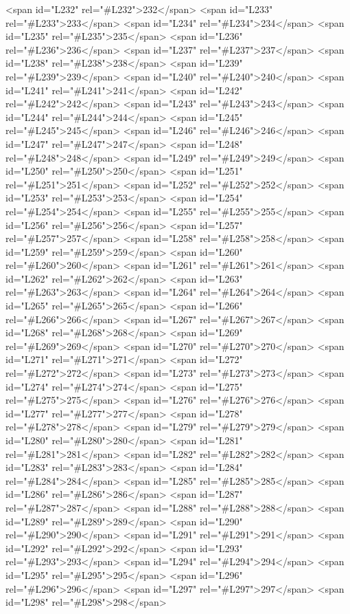 <span id="L232" rel="#L232">232</span>
<span id="L233" rel="#L233">233</span>
<span id="L234" rel="#L234">234</span>
<span id="L235" rel="#L235">235</span>
<span id="L236" rel="#L236">236</span>
<span id="L237" rel="#L237">237</span>
<span id="L238" rel="#L238">238</span>
<span id="L239" rel="#L239">239</span>
<span id="L240" rel="#L240">240</span>
<span id="L241" rel="#L241">241</span>
<span id="L242" rel="#L242">242</span>
<span id="L243" rel="#L243">243</span>
<span id="L244" rel="#L244">244</span>
<span id="L245" rel="#L245">245</span>
<span id="L246" rel="#L246">246</span>
<span id="L247" rel="#L247">247</span>
<span id="L248" rel="#L248">248</span>
<span id="L249" rel="#L249">249</span>
<span id="L250" rel="#L250">250</span>
<span id="L251" rel="#L251">251</span>
<span id="L252" rel="#L252">252</span>
<span id="L253" rel="#L253">253</span>
<span id="L254" rel="#L254">254</span>
<span id="L255" rel="#L255">255</span>
<span id="L256" rel="#L256">256</span>
<span id="L257" rel="#L257">257</span>
<span id="L258" rel="#L258">258</span>
<span id="L259" rel="#L259">259</span>
<span id="L260" rel="#L260">260</span>
<span id="L261" rel="#L261">261</span>
<span id="L262" rel="#L262">262</span>
<span id="L263" rel="#L263">263</span>
<span id="L264" rel="#L264">264</span>
<span id="L265" rel="#L265">265</span>
<span id="L266" rel="#L266">266</span>
<span id="L267" rel="#L267">267</span>
<span id="L268" rel="#L268">268</span>
<span id="L269" rel="#L269">269</span>
<span id="L270" rel="#L270">270</span>
<span id="L271" rel="#L271">271</span>
<span id="L272" rel="#L272">272</span>
<span id="L273" rel="#L273">273</span>
<span id="L274" rel="#L274">274</span>
<span id="L275" rel="#L275">275</span>
<span id="L276" rel="#L276">276</span>
<span id="L277" rel="#L277">277</span>
<span id="L278" rel="#L278">278</span>
<span id="L279" rel="#L279">279</span>
<span id="L280" rel="#L280">280</span>
<span id="L281" rel="#L281">281</span>
<span id="L282" rel="#L282">282</span>
<span id="L283" rel="#L283">283</span>
<span id="L284" rel="#L284">284</span>
<span id="L285" rel="#L285">285</span>
<span id="L286" rel="#L286">286</span>
<span id="L287" rel="#L287">287</span>
<span id="L288" rel="#L288">288</span>
<span id="L289" rel="#L289">289</span>
<span id="L290" rel="#L290">290</span>
<span id="L291" rel="#L291">291</span>
<span id="L292" rel="#L292">292</span>
<span id="L293" rel="#L293">293</span>
<span id="L294" rel="#L294">294</span>
<span id="L295" rel="#L295">295</span>
<span id="L296" rel="#L296">296</span>
<span id="L297" rel="#L297">297</span>
<span id="L298" rel="#L298">298</span>
